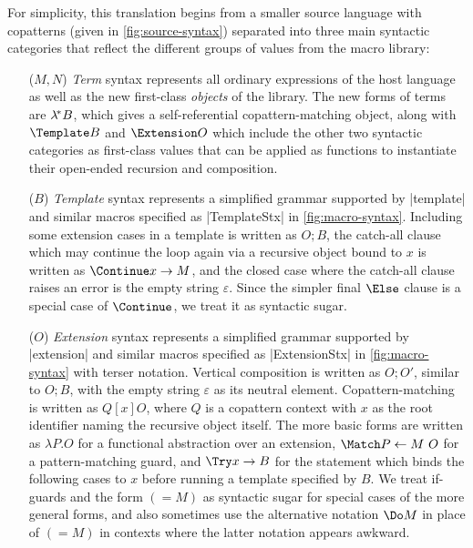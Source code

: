 For simplicity, this translation begins from a smaller source language with copatterns (given in \cref{fig:source-syntax}) separated into three main syntactic categories that reflect the different groups of values from the macro library:
\begin{itemize}
\item[($M, N$)] \emph{Term} syntax represents all ordinary expressions of the host language as well as the new first-class \emph{objects} of the library.
  The new forms of terms are $\lambda^{\!*} B$, which gives a self-referential copattern-matching object, along with $\Template B$ and $\Extension O$ which include the other two syntactic categories as first-class values that can be applied as functions to instantiate their open-ended recursion and composition.
\item[($B$)] \emph{Template} syntax represents a simplified grammar supported by \scm|template| and similar macros specified as \scm|TemplateStx| in \cref{fig:macro-syntax}.
  Including some extension cases in a template is written as $O; B$, the catch-all clause which may continue the loop again via a recursive object bound to $x$ is written as $\Continue x \to M$, and the closed case where the catch-all clause raises an error is the empty string $\varepsilon$.
  Since the simpler final $\Else$ clause is a special case of $\Continue$, we treat it as syntactic sugar.
\item[($O$)] \emph{Extension} syntax represents a simplified grammar supported by \scm|extension| and similar macros specified as \scm|ExtensionStx| in \cref{fig:macro-syntax} with terser notation.
  Vertical composition is written as $O; O'$, similar to $O; B$, with the empty string $\varepsilon$ as its neutral element.
  Copattern-matching is written as $Q[x] O$, where $Q$ is a copattern context with $x$ as the root identifier naming the recursive object itself.
  The more basic forms are written as $\lambda P. O$ for a functional abstraction over an extension, $\Match P \gets M ~ O$ for a pattern-matching guard, and $\Try x \to B$ for the statement which binds the following cases to $x$ before running a template specified by $B$.
  We treat if-guards and the form $(= M)$ as syntactic sugar for special cases of the more general forms, and also sometimes use the alternative notation $\Do M$ in place of $(= M)$ in contexts where the latter notation appears awkward.
\end{itemize}

